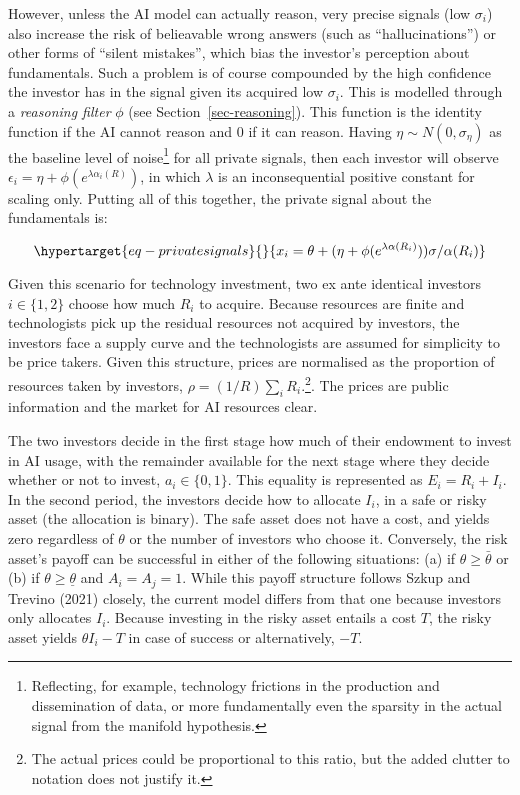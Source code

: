 \documentclass[
]{article}
\theoremstyle{plain}
\theoremstyle{remark}
\begin{document}
However, unless the AI model can actually reason, very precise signals
(low \(\sigma_i\)) also increase the risk of belieavable wrong answers
(such as ``hallucinations'') or other forms of ``silent mistakes'',
which bias the investor's perception about fundamentals. Such a problem
is of course compounded by the high confidence the investor has in the
signal given its acquired low \(\sigma_i\). This is modelled through a
\emph{reasoning filter} \(\phi\) (see Section~\ref{sec-reasoning}). This
function is the identity function if the AI cannot reason and 0 if it
can reason. Having \(\eta \sim N(0, \sigma_\eta)\) as the baseline level
of noise\footnote{Reflecting, for example, technology frictions in the
  production and dissemination of data, or more fundamentally even the
  sparsity in the actual signal from the manifold hypothesis.} for all
private signals, then each investor will observe
\(\epsilon_i = \eta + \phi(e^{\lambda \alpha_i(R)})\), in which
\(\lambda\) is an inconsequential positive constant for scaling only.
Putting all of this together, the private signal about the fundamentals
is:

\begin{equation}\protect\hypertarget{eq-privatesignals}{}{
x_i = \theta + (\eta + \phi(e^{\lambda \alpha(R_i)})) \sigma / \alpha(R_i)
}\label{eq-privatesignals}\end{equation}

Given this scenario for technology investment, two ex ante identical
investors \(i \in \{1,2\}\) choose how much \(R_i\) to acquire. Because
resources are finite and technologists pick up the residual resources
not acquired by investors, the investors face a supply curve and the
technologists are assumed for simplicity to be price takers. Given this
structure, prices are normalised as the proportion of resources taken by
investors, \(\rho = (1/R)\sum_i R_i\).\footnote{The actual prices could
  be proportional to this ratio, but the added clutter to notation does
  not justify it.}. The prices are public information and the market for
AI resources clear.

The two investors decide in the first stage how much of their endowment
to invest in AI usage, with the remainder available for the next stage
where they decide whether or not to invest, \(a_i \in \{0, 1\}\). This
equality is represented as \(E_i = R_i + I_i\). In the second period,
the investors decide how to allocate \(I_i\), in a safe or risky asset
(the allocation is binary). The safe asset does not have a cost, and
yields zero regardless of \(\theta\) or the number of investors who
choose it. Conversely, the risk asset's payoff can be successful in
either of the following situations: (a) if \(\theta \geq \bar{\theta}\)
or (b) if \(\theta \geq \underline{\theta}\) and \(A_i = A_j = 1\).
While this payoff structure follows Szkup and Trevino (2021) closely,
the current model differs from that one because investors only allocates
\(I_i\). Because investing in the risky asset entails a cost \(T\), the
risky asset yields \(\theta I_i - T\) in case of success or
alternatively, \(-T\).
\end{document}
